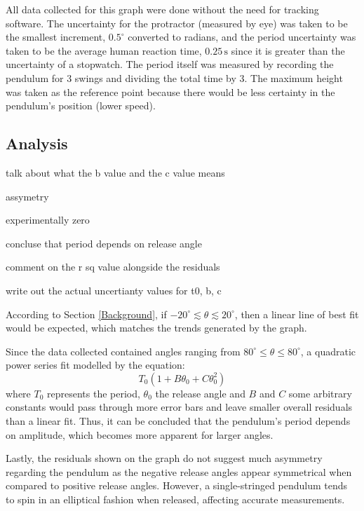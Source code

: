 \documentclass[12pt]{article}
\begin{document}
All data collected for this graph were done without the need for tracking software. The uncertainty for the protractor (measured by eye) was taken to be the smallest increment, $0.5^{\circ}$ converted to radians, and the period uncertainty was taken to be the average human reaction time, $0.25\,\text{s}$ \cite{reaction-time} {\color{blue} since it is greater than the uncertainty of a stopwatch. The period itself was measured by recording the pendulum for 3 swings and dividing the total time by 3. The maximum height was taken as the reference point because there would be less certainty in the pendulum's position (lower speed).}

\subsection{Analysis}
{\color{blue}
talk about what the b value and the c value means

assymetry

experimentally zero

concluse that period depends on release angle

comment on the r sq value alongside the residuals

write out the actual uncertianty values for t0, b, c
}

According to Section \ref{Background}, if $-20^{\circ} \lesssim \theta \lesssim 20^{\circ}$, then a linear line of best fit would be expected, which matches the trends generated by the graph.

Since the data collected contained angles ranging from $ 80^{\circ} \leq \theta \leq 80^{\circ}$, a quadratic power series fit modelled by the equation:
\begin{equation} \label{eq:power series}
    T_0(1 + B\theta_0 + C\theta_0^2)
\end{equation}
where $T_0$ represents the period, $\theta_0$ the release angle and $B$ and $C$ some arbitrary constants would pass through more error bars and leave smaller overall residuals than a linear fit. Thus, it can be concluded that the pendulum's period depends on amplitude, which becomes more apparent for larger angles.

Lastly, the residuals shown on the graph do not suggest much asymmetry regarding the pendulum as the negative release angles appear symmetrical when compared to positive release angles. However, a single-stringed pendulum tends to spin in an elliptical fashion when released, affecting accurate measurements.
\end{document}
